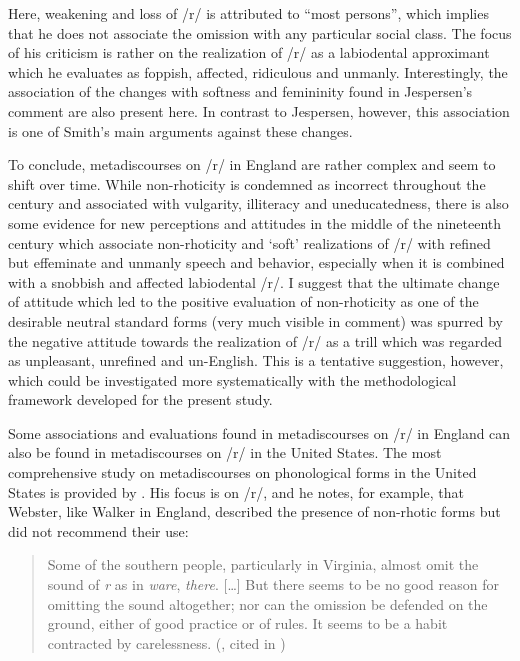 Here, weakening and loss of /r/ is attributed to “most persons”, which implies that he does not associate the omission with any particular social class. The focus of his criticism is rather on the realization of /r/ as a labiodental approximant which he evaluates as foppish, affected, ridiculous and unmanly. Interestingly, the association of the changes with softness and femininity found in Jespersen’s comment are also present here. In contrast to Jespersen, however, this association is one of Smith’s main arguments against these changes.

To conclude, metadiscourses on /r/ in England are rather complex and seem to shift over time. While non-rhoticity is condemned as incorrect throughout the century and associated with vulgarity, illiteracy and uneducatedness, there is also some evidence for new perceptions and attitudes in the middle of the nineteenth century which associate non-rhoticity and ‘soft’ realizations of /r/ with refined but effeminate and unmanly speech and behavior, especially when it is combined with a snobbish and affected labiodental /r/. I suggest that the ultimate change of attitude which led to the positive evaluation of non-rhoticity as one of the desirable neutral standard forms (very much visible in  comment) was spurred by the negative attitude towards the realization of /r/ as a trill which was regarded as unpleasant, unrefined and un-English. This is a tentative suggestion, however, which could be investigated more systematically with the methodological framework developed for the present study.

Some associations and evaluations found in metadiscourses on /r/ in England can also be found in metadiscourses on /r/ in the United States. The most comprehensive study on metadiscourses on phonological forms in the United States is provided by \citet{Bonfiglio2002}. His focus is on /r/, and he notes, for example, that Webster, like Walker in England, described the presence of non-rhotic forms but did not recommend their use:

\begin{quote}
Some of the southern people, particularly in Virginia, almost omit the sound of \emph{r} as in \emph{ware}, \emph{there}. […] But there seems to be no good reason for omitting the sound altogether; nor can the omission be defended on the ground, either of good practice or of rules. It seems to be a habit contracted by carelessness. (\citealt[110]{Webster1789}, cited in \citealt[38]{Bonfiglio2002})
\end{quote}


